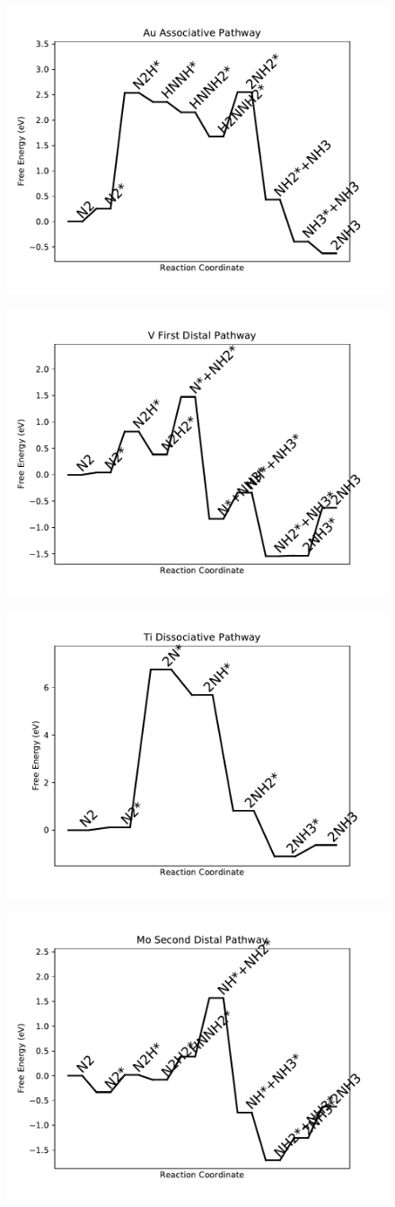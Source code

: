 \documentclass[journal=jacsat,manuscript=article]{achemso}
\begin{document}
\begin{figure}
\includegraphics[width=0.5\linewidth]{data/plots/Au_associative.pdf}
\label{fig:Au_associative}
\end{figure}

\begin{figure}
\includegraphics[width=0.5\linewidth]{data/plots/V_distal_1.pdf}
\label{fig:V_distal_1}
\end{figure}

\begin{figure}
\includegraphics[width=0.5\linewidth]{data/plots/Ti_dissociative.pdf}
\label{fig:Ti_dissociative}
\end{figure}

\begin{figure}
\includegraphics[width=0.5\linewidth]{data/plots/Mo_distal_2.pdf}
\label{fig:Mo_distal_2}
\end{figure}
\end{document}
